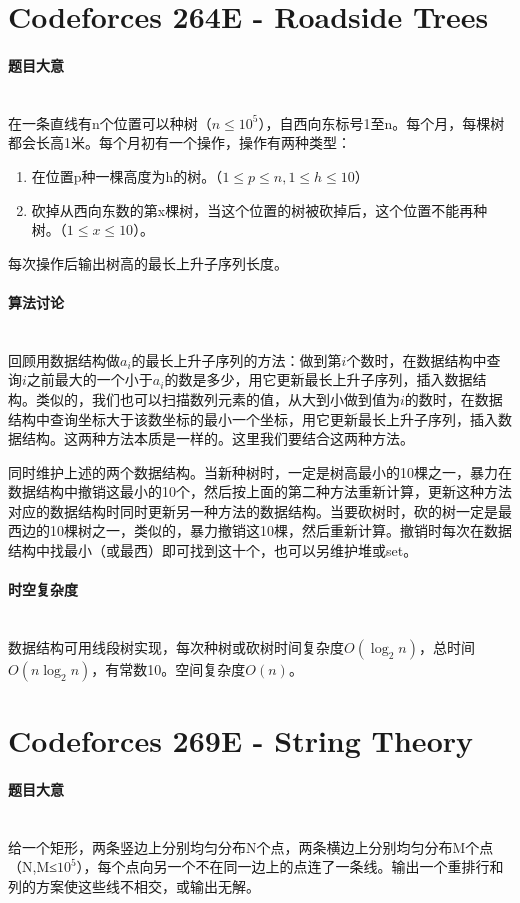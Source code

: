 \documentclass[UTF8]{ctexart}
\newcommand{\myparagraph}[1]{\paragraph{#1}\mbox{}\\}
\theoremstyle{nonumberplain}
\begin{document}
	\section{Codeforces 264E - Roadside Trees}
	
		\myparagraph{题目大意}
		
			在一条直线有n个位置可以种树（$n \leq 10^5$），自西向东标号1至n。每个月，每棵树都会长高1米。每个月初有一个操作，操作有两种类型：
			
			\begin{enumerate}
				\item 在位置p种一棵高度为h的树。（$1 \leq p \leq n, 1 \leq h \leq 10$）
				\item 砍掉从西向东数的第x棵树，当这个位置的树被砍掉后，这个位置不能再种树。（$1 \leq x \leq 10$）。
			\end{enumerate}
			
			每次操作后输出树高的最长上升子序列长度。
		
		\myparagraph{算法讨论}
		
			回顾用数据结构做${a_i}$的最长上升子序列的方法：做到第$i$个数时，在数据结构中查询$i$之前最大的一个小于$a_i$的数是多少，用它更新最长上升子序列，插入数据结构。类似的，我们也可以扫描数列元素的值，从大到小做到值为$i$的数时，在数据结构中查询坐标大于该数坐标的最小一个坐标，用它更新最长上升子序列，插入数据结构。这两种方法本质是一样的。这里我们要结合这两种方法。
			
			同时维护上述的两个数据结构。当新种树时，一定是树高最小的10棵之一，暴力在数据结构中撤销这最小的10个，然后按上面的第二种方法重新计算，更新这种方法对应的数据结构时同时更新另一种方法的数据结构。当要砍树时，砍的树一定是最西边的10棵树之一，类似的，暴力撤销这10棵，然后重新计算。撤销时每次在数据结构中找最小（或最西）即可找到这十个，也可以另维护堆或set。
		
		\myparagraph{时空复杂度}
		
			数据结构可用线段树实现，每次种树或砍树时间复杂度$O(\log_2n)$，总时间$O(n\log_2n)$，有常数10。空间复杂度$O(n)$。
	
	\section{Codeforces 269E - String Theory}
	
		\myparagraph{题目大意}
			
			给一个矩形，两条竖边上分别均匀分布N个点，两条横边上分别均匀分布M个点（N,M≤$10^5$），每个点向另一个不在同一边上的点连了一条线。输出一个重排行和列的方案使这些线不相交，或输出无解。
			
\end{document}
